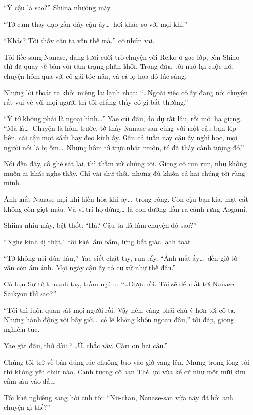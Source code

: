 \documentclass[../main.tex]{subfiles}
\begin{document}
``Ý cậu là sao?'' Shiina nhướng mày.

``Tớ cảm thấy dạo gần đây cậu ấy\dots\ hơi khác so với mọi khi.''

``Khác? Tôi thấy cậu ta vẫn thế mà,'' cô nhún vai.

Tôi liếc sang Nanase, đang tươi cười trò chuyện với Reiko ở góc lớp, còn Shino thì đã quay về bàn với tâm trạng phấn khởi. Trong đầu, tôi nhớ lại cuộc nói chuyện hôm qua với cô gái tóc nâu, và cả lọ hoa đỏ lúc sáng.

Nhưng lời thoát ra khỏi miệng lại lạnh nhạt: ``\dots Ngoài việc cô ấy đang nói chuyện rất vui vẻ với mọi người thì tôi chẳng thấy có gì bất thường.''

``Ý tớ không phải là ngoại hình\dots'' Yae cúi đầu, do dự rất lâu, rồi mới hạ giọng. ``Mà là\dots\ Chuyện là hôm trước, tớ thấy Nanase-san cùng với một cậu bạn lớp bên, cái cậu mọt sách hay đeo kính ấy. Gần cả tuần nay cậu ấy nghỉ học, mọi người nói là bị ốm\dots\ Nhưng hôm tớ trực nhật muộn, tớ đã thấy cảnh tượng đó.''

Nói đến đây, cô ghé sát lại, thì thầm với chúng tôi. Giọng cô run run, như không muốn ai khác nghe thấy. Chỉ vài chữ thôi, nhưng đủ khiến cả hai chúng tôi rùng mình.

Ánh mắt Nanase mọi khi hiền hòa khi ấy\dots\ trống rỗng. Còn cậu bạn kia, mặt cắt không còn giọt máu. Và vị trí họ đứng\dots\ là con đường dẫn ra cánh rừng Aogami.

Shiina nhíu mày, bật thốt: ``Hả? Cậu ta đã làm chuyện đó sao?''

``Nghe kinh dị thật,'' tôi khẽ lẩm bẩm, lưng bất giác lạnh toát.

``Tớ không nói đùa đâu,'' Yae siết chặt tay, run rẩy. ``Ánh mắt ấy\dots\ đến giờ tớ vẫn còn ám ảnh. Mọi ngày cậu ấy có cư xử như thế đâu.''

Cô bạn Sư tử khoanh tay, trầm ngâm: ``\dots Được rồi. Tôi sẽ để mắt tới Nanase. Saikyou thì sao?''

``Tôi thì luôn quan sát mọi người rồi. Vậy nên, càng phải chú ý hơn tới cô ta. Nhưng hành động vội bây giờ\dots\ có lẽ không khôn ngoan đâu,'' tôi đáp, giọng nghiêm túc.

Yae gật đầu, thở dài: ``\dots Ừ, chắc vậy. Cảm ơn hai cậu.''

Chúng tôi trở về bàn đúng lúc chuông báo vào giờ vang lên. Nhưng trong lòng tôi thì không yên chút nào. Cảnh tượng cô bạn Thể lực vừa kể cứ như một mũi kim cắm sâu vào đầu.

Tôi khẽ nghiêng sang hỏi anh tôi: ``Nii-chan, Nanase-san vừa nãy đã hỏi anh chuyện gì thế?''
\end{document}
